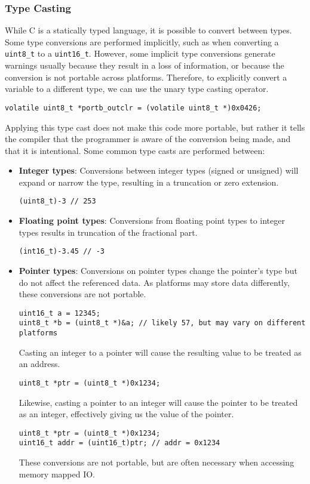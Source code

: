 \documentclass{article}
\begin{document}
\subsubsection{Type Casting}
While C is a statically typed language, it is possible to convert
between types. Some type conversions are performed implicitly, such as
when converting a \texttt{uint8_t} to a
\texttt{uint16_t}. However, some implicit type conversions
generate warnings usually because they result in a loss of information,
or because the conversion is not portable across platforms. Therefore,
to explicitly convert a variable to a different type, we can use the
unary type casting operator.
\begin{verbatim}
volatile uint8_t *portb_outclr = (volatile uint8_t *)0x0426;
\end{verbatim}
Applying this type cast does not make this code more portable, but
rather it tells the compiler that the programmer is aware of the
conversion being made, and that it is intentional.
Some common type casts are performed between:
\begin{itemize}
    \item \textbf{Integer types}: Conversions between integer types
          (signed or unsigned) will expand or narrow the type, resulting in a
          truncation or zero extension.
          \begin{verbatim}
(uint8_t)-3 // 253
\end{verbatim}
    \item \textbf{Floating point types}: Conversions from floating point
          types to integer types results in truncation of the fractional part.
          \begin{verbatim}
(int16_t)-3.45 // -3
\end{verbatim}
    \item \textbf{Pointer types}: Conversions on pointer types change
          the pointer's type but do not affect the referenced data. As
          platforms may store data differently, these conversions are
          not portable.
          \begin{verbatim}
uint16_t a = 12345;
uint8_t *b = (uint8_t *)&a; // likely 57, but may vary on different platforms
\end{verbatim}
          Casting an integer to a pointer will cause the resulting
          value to be treated as an address.
          \begin{verbatim}
uint8_t *ptr = (uint8_t *)0x1234;
\end{verbatim}
          Likewise, casting a pointer to an integer will cause the
          pointer to be treated as an integer, effectively giving us
          the value of the pointer.
          \begin{verbatim}
uint8_t *ptr = (uint8_t *)0x1234;
uint16_t addr = (uint16_t)ptr; // addr = 0x1234
\end{verbatim}
          These conversions are not portable, but are often necessary
          when accessing memory mapped IO\@.
\end{itemize}
\end{document}
